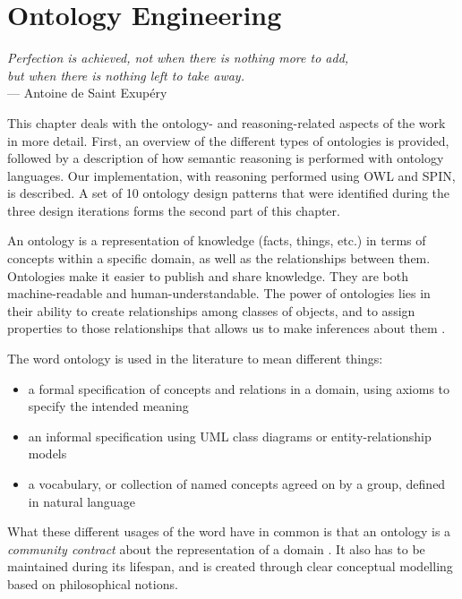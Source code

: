 \chapter{Ontology Engineering}
\label{OntologyEngineering}

\begin{flushright}{\slshape    
Perfection is achieved, not when there is nothing more to add, \\
but when there is nothing left to take away.} \\ \medskip
    ---  Antoine de Saint Exup\'ery
\end{flushright}

This chapter deals with the ontology- and reasoning-related aspects of the work in more detail. First, an overview of the different types of ontologies is provided, followed by a description of how semantic reasoning is performed with ontology languages. Our implementation, with reasoning performed using \ac{OWL} and \ac{SPIN}, is described. A set of 10 ontology design patterns that were identified during the three design iterations forms the second part of this chapter.

An ontology is a representation of knowledge (facts, things, etc.) in terms of concepts within a specific domain, as well as the relationships between them. Ontologies make it easier to publish and share knowledge. They are both machine-readable and human-understandable. The power of ontologies lies in their ability to create relationships among classes of objects, and to assign properties to those relationships that allows us to make inferences about them \cite{Jepsen2009}.

The word ontology is used in the literature to mean different things:
\begin{itemize}
	\item a formal specification of concepts and relations in a domain, using axioms to specify the intended meaning
	\item an informal specification using UML class diagrams or entity-relationship models
	\item a vocabulary, or collection of named concepts agreed on by a group, defined in natural language
\end{itemize}

 What these different usages of the word have in common is that an ontology is a \emph{community contract}\label{CommunityContract} about the representation of a domain \cite{Hepp2007}. It also has to be maintained during its lifespan, and is created through clear conceptual modelling based on philosophical notions. 

